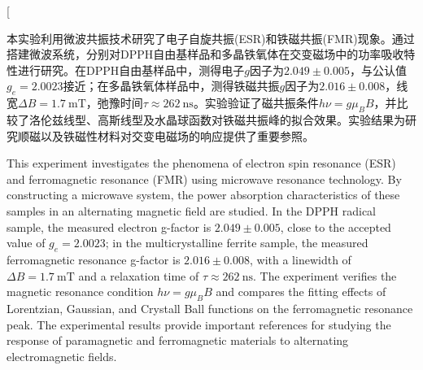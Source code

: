 \documentclass{thuemp}
\begin{document}
    
    
    
    \twocolumn[
    \begin{@twocolumnfalse}
    \maketitle
    
    \begin{empAbstract}
        本实验利用微波共振技术研究了电子自旋共振(ESR)和铁磁共振(FMR)现象。通过搭建微波系统，分别对DPPH自由基样品和多晶铁氧体在交变磁场中的功率吸收特性进行研究。在DPPH自由基样品中，测得电子$g$因子为$2.049 \pm 0.005$，与公认值$g_e=2.0023$接近；在多晶铁氧体样品中，测得铁磁共振$g$因子为$2.016 \pm 0.008$，线宽$\Delta B = \SI{1.7}{\milli\tesla}$，弛豫时间$\tau \approx \SI{262}{\nano\second}$。实验验证了磁共振条件$h\nu = g\mu_B B$，并比较了洛伦兹线型、高斯线型及水晶球函数对铁磁共振峰的拟合效果。实验结果为研究顺磁以及铁磁性材料对交变电磁场的响应提供了重要参照。
    \end{empAbstract}
    
    
    \begin{empAbstractEn}
        This experiment investigates the phenomena of electron spin resonance (ESR) and ferromagnetic resonance (FMR) using microwave resonance technology. By constructing a microwave system, the power absorption characteristics of these samples in an alternating magnetic field are studied. In the DPPH radical sample, the measured electron g-factor is $2.049 \pm 0.005$, close to the accepted value of $g_e=2.0023$; in the multicrystalline ferrite sample, the measured ferromagnetic resonance g-factor is $2.016 \pm 0.008$, with a linewidth of $\Delta B = \SI{1.7}{\milli\tesla}$ and a relaxation time of $\tau \approx \SI{262}{\nano\second}$. The experiment verifies the magnetic resonance condition $h\nu = g\mu_B B$ and compares the fitting effects of Lorentzian, Gaussian, and Crystall Ball functions on the ferromagnetic resonance peak. The experimental results provide important references for studying the response of paramagnetic and ferromagnetic materials to alternating electromagnetic fields.
    \end{empAbstractEn}
    
    \end{@twocolumnfalse}
\end{document}
